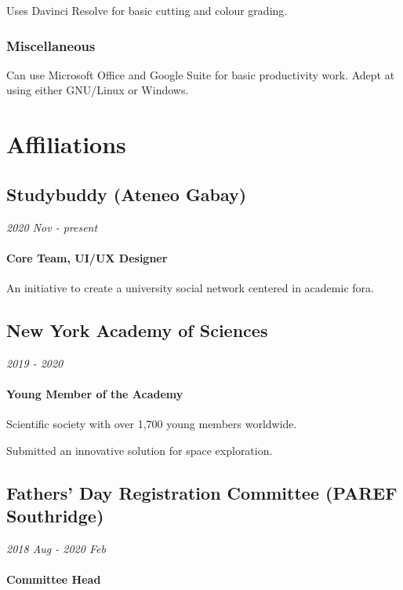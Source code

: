 \documentclass[a4paper,10pt]{article}
\newcommand{\dates}{\hfill\textit}
\begin{document}
Uses Davinci Resolve for basic cutting and colour grading.

\subsubsection{Miscellaneous}

Can use Microsoft Office and Google Suite for basic productivity work. Adept at using either GNU/Linux or Windows.


\section{Affiliations}

\subsection{Studybuddy (Ateneo Gabay)}

\dates{2020 Nov - present}

\paragraph{Core Team, UI/UX Designer}

An initiative to create a university social network centered in academic fora. 

\subsection{New York Academy of Sciences}

\dates{2019 - 2020}

\paragraph{Young Member of the Academy}

Scientific society with over 1,700 young members worldwide.

Submitted an innovative solution for space exploration.

\subsection{Fathers' Day Registration Committee (PAREF Southridge)}

\dates{2018 Aug - 2020 Feb}

\paragraph{Committee Head}
\end{document}
